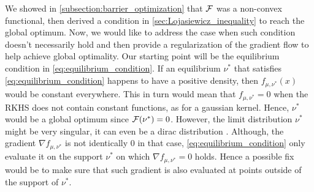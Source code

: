 We showed in \cref{subsection:barrier_optimization} that ${{\mathcal F}}$ was a non-convex functional, then derived a condition in \cref{sec:Lojasiewicz_inequality} to reach the global optimum. Now, we would like to address the case when such condition doesn't necessarily hold and then provide a regularization of the gradient flow to help achieve global optimality. Our starting point will be the equilibrium condition in \cref{eq:equilibrium_condition}. If an equilibrium $\nu^*$ that satisfies \cref{eq:equilibrium_condition} happens to have a positive density, then $f_{\mu,\nu^{*}}(x)$ would be constant everywhere. This in turn would mean that $f_{\mu,\nu^{*}}=0$ when the RKHS does not contain constant functions, as for a gaussian kernel. Hence, $\nu^*$ would be a global optimum since ${{\mathcal F}}(\nu^{*})=0$. However, the limit distribution $\nu^*$  might be very singular, it can even be a dirac distribution \cite[Theorem 6]{mei2018mean}. Although, the gradient $\nabla f_{\mu,\nu^{*}}$ is not identically $0$ in that case,  \cref{eq:equilibrium_condition} only evaluate it on the support $\nu^{*}$ on which $\nabla f_{\mu,\nu^{*}}=0$ holds. Hence a possible fix would be to make sure that such gradient is also evaluated at points outside of the support of $\nu^{*}$. 
